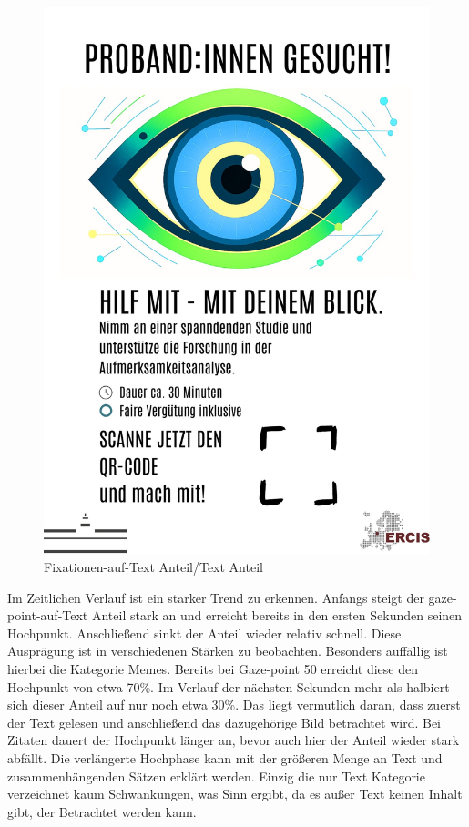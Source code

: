 \documentclass[
    language=german, %
    thesis=seminar, %
    supervisor=postdoc, %
    multiauthor=true, %
    ]{settings/csssa-thesis}
\begin{document}
\begin{figure}[h]
    \centering
    \includegraphics[width=\linewidth,height=0.8\textheight,keepaspectratio]{figures/Dummy.jpg}
    \caption{Fixationen-auf-Text Anteil/Text Anteil}\label{fig:bild26}
\end{figure}

Im Zeitlichen Verlauf ist ein starker Trend zu erkennen. Anfangs steigt der gaze-point-auf-Text Anteil stark an und erreicht 
bereits in den ersten Sekunden seinen Hochpunkt. Anschließend sinkt der Anteil wieder relativ schnell. 
Diese Ausprägung ist in verschiedenen Stärken zu beobachten. Besonders auffällig ist hierbei die Kategorie Memes. 
Bereits bei Gaze-point 50 erreicht diese den Hochpunkt von etwa 70\%. Im Verlauf der nächsten Sekunden 
mehr als halbiert sich dieser Anteil auf nur noch etwa 30\%. Das liegt vermutlich daran, dass zuerst der Text 
gelesen und anschließend das dazugehörige Bild betrachtet wird. Bei Zitaten dauert der Hochpunkt länger an, 
bevor auch hier der Anteil wieder stark abfällt. Die verlängerte Hochphase kann mit der größeren Menge an Text 
und zusammenhängenden Sätzen erklärt werden. Einzig die nur Text Kategorie verzeichnet kaum Schwankungen, 
was Sinn ergibt, da es außer Text keinen Inhalt gibt, der Betrachtet werden kann. 
\end{document}
